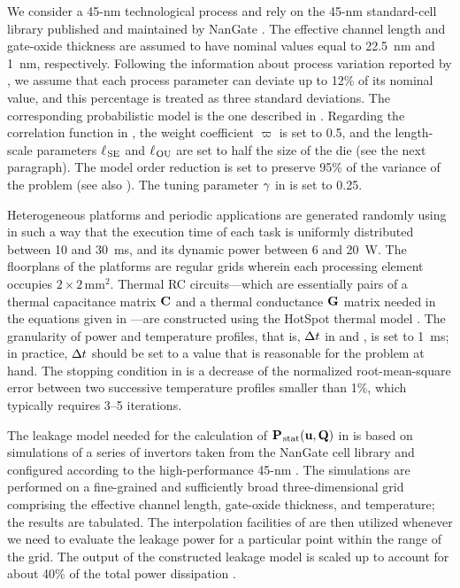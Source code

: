 We consider a 45-nm technological process and rely on the 45-nm standard-cell library published and maintained by NanGate \cite{nangate}.
The effective channel length and gate-oxide thickness are assumed to have nominal values equal to 22.5~nm and 1~nm, respectively.
Following the information about process variation reported by  \cite{itrs}, we assume that each process parameter can deviate up to 12\% of its nominal value, and this percentage is treated as three standard deviations.
The corresponding probabilistic model is the one described in .
Regarding the correlation function in , the weight coefficient $\varpi$ is set to 0.5, and the length-scale parameters $\ell_{\text{\kern0.1emSE}}$ and $\ell_{\text{\kern0.1emOU}}$ are set to half the size of the die (see the next paragraph).
The model order reduction is set to preserve 95\% of the variance of the problem (see also ).
The tuning parameter $\gamma$ in  is set to 0.25.

Heterogeneous platforms and periodic applications are generated randomly using  \cite{dick1998} in such a way that the execution time of each task is uniformly distributed between 10 and 30~ms, and its dynamic power between 6 and 20~W.
The floorplans of the platforms are regular grids wherein each processing element occupies $2 \times 2\,\text{mm}^2$.
Thermal RC circuits---which are essentially pairs of a thermal capacitance matrix $\mathbf{C}$ and a thermal conductance $\mathbf{G}$ matrix needed in the equations given in ---are constructed using the HotSpot thermal model \cite{skadron2004}.
The granularity of power and temperature profiles, that is, $\Delta t$ in  and , is set to 1~ms; in practice, $\Delta t$ should be set to a value that is reasonable for the problem at hand.
The stopping condition in  is a decrease of the normalized root-mean-square error between two successive temperature profiles smaller than 1\%, which typically requires 3--5 iterations.

The leakage model needed for the calculation of $\mathbf{P}_{\text{\kern0.1emstat}}(\mathbf{u}, \mathbf{Q})$ in  is based on  simulations of a series of  invertors taken from the NanGate cell library and configured according to the high-performance 45-nm  \cite{ptm}.
The simulations are performed on a fine-grained and sufficiently broad three-dimensional grid comprising the effective channel length, gate-oxide thickness, and temperature; the results are tabulated.
The interpolation facilities of  \cite{matlab} are then utilized whenever we need to evaluate the leakage power for a particular point within the range of the grid.
The output of the constructed leakage model is scaled up to account for about 40\% of the total power dissipation \cite{liu2007}.
